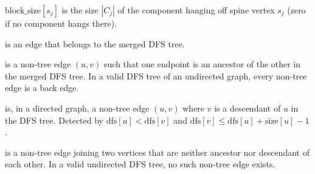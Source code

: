 \begin{ppdefn}
 $\mathrm{block\_size}[s_j]$ is the size $|C_j|$
of the component hanging off spine vertex $s_j$ (zero if no component
hangs there).
\end{ppdefn}

\begin{ppdefn}
 is an edge that belongs to the merged DFS tree.
\end{ppdefn}

\begin{ppdefn}
 is a non-tree edge $(u, v)$ such that one endpoint
is an ancestor of the other in the merged DFS tree.  In a valid DFS
tree of an undirected graph, every non-tree edge is a back edge.
\end{ppdefn}

\begin{ppdefn}
 is, in a directed graph, a non-tree edge
$(u, v)$ where $v$ is a descendant of $u$ in the DFS tree.  Detected
by $\mathrm{dfs}[u] < \mathrm{dfs}[v]$ and
$\mathrm{dfs}[v] \le \mathrm{dfs}[u] + \mathrm{size}[u] - 1$.
\end{ppdefn}

\begin{ppdefn}
 is a non-tree edge joining two vertices that are
neither ancestor nor descendant of each other.  In a valid undirected
DFS tree, no such non-tree edge exists.
\end{ppdefn}